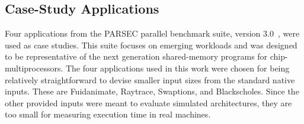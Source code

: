 \subsection{Case-Study Applications} \label{sec:casestudyapplication}
Four applications from the PARSEC parallel benchmark suite, version 3.0~\cite{Bienia2008}, were used as case studies. 
This suite focuses on emerging workloads and was designed to be representative of the next generation shared-memory programs for chip-multiprocessors. The four applications used in this work were chosen for being relatively straightforward to devise smaller input sizes from the standard native inputs. 
These are Fuidanimate, Raytrace, Swaptions, and Blackscholes.
Since the other provided inputs were meant to evaluate simulated architectures, they are too small for measuring execution time in real machines.



